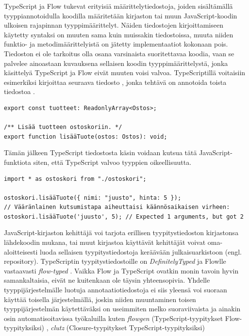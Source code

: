 TypeScript ja Flow tukevat erityisiä määrittelytiedostoja, joiden sisältämällä
tyyppiannotoidulla koodilla määritetään kirjaston tai muun JavaScript-koodin
ulkoisen rajapinnan tyyppimäärittelyt. Näiden tiedostojen kirjoittamiseen
käytetty syntaksi on muuten sama kuin muissakin tiedostoissa, muuta niiden funktio- ja
metodimäärittelyistä on jätetty implementaatiot kokonaan pois. Tiedoston ei
ole tarkoitus olla osana varsinaista suoritettavaa koodia, vaan se palvelee
ainoastaan kuvauksena sellaisen koodin tyyppimäärittelystä, jonka käsittelyä
TypeScript ja Flow eivät muuten voisi valvoa. TypeScriptillä voitaisiin
esimerkiksi kirjoittaa seuraava tiedosto , jonka
tehtävä on annotoida toista tiedostoa .
\begin{lstlisting}[caption={Esimerkki TypeScript määrittelytiedostosta ostoskori.d.ts}]
export const tuotteet: ReadonlyArray<Ostos>;

/** Lisää tuotteen ostoskoriin. */
export function lisääTuote(ostos: Ostos): void;
\end{lstlisting}
Tämän jälkeen TypeScript tiedostosta käsin voidaan kutsua tätä
JavaScript-funktiota siten, että TypeScript valvoo
tyyppien oikeellisuutta.
\begin{lstlisting}[caption={JavaScript-koodin kutsuminen TypeScript tiedostosta tuotesivu.ts}]
import * as ostoskori from "./ostoskori";

ostoskori.lisääTuote({ nimi: "juusto", hinta: 5 });
// Vääränlainen kutsumistapa aiheuttaisi käännösaikaisen virheen:
ostoskori.lisääTuote('juusto', 5); // Expected 1 arguments, but got 2
\end{lstlisting}
JavaScript-kirjaston kehittäjä voi tarjota erillisen tyypitystiedoston
kirjastonsa lähdekoodin mukana, tai muut kirjastoa käyttävät kehittäjät
voivat oma-aloitteisesti luoda sellaisen tyypitystiedostoja keräävään
julkaisuarkistoon (engl. repository).
TypeScriptin tyy\-pi\-tys\-tie\-dos\-toil\-le
on \textit{DefinitelyTyped} \cite{DefinitelyTyped} ja Flowlle
vastaavasti \textit{flow-typed} \cite{FlowTyped}. Vaikka Flow ja TypeScript
ovatkin monin tavoin hyvin samankaltaisia, eivät ne kuitenkaan ole täysin
yhteensopivia. Yhdelle tyyppijärjestelmälle luotuja annotaatiotiedostoja
ei siis yleensä voi suoraan käyttää toisella järjestelmällä, joskin niiden
muuntaminen toisen tyyppijärjestelmän käytettäväksi on useimmiten melko
suoraviivaista ja ainakin osin automatisoitavissa työkaluilla kuten
\textit{flowgen} (TypeScript-tyypitykset Flow-tyypityksiksi) \cite{Flowgen},
\textit{clutz}  (Closure-tyypitykset TypeScript-tyypityksiksi) \cite{Clutz}
